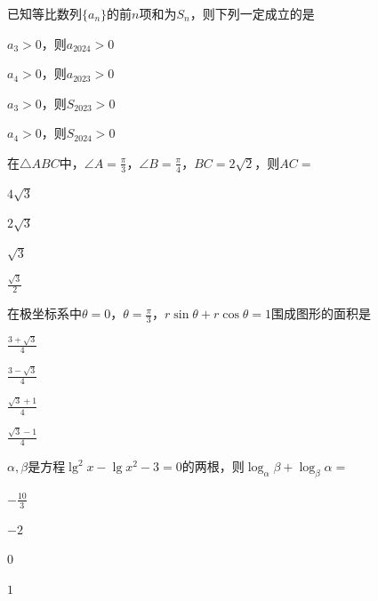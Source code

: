 \documentclass{exam-zh}
\begin{document}
\begin{question}
  已知等比数列$\{a_n\}$的前$n$项和为$S_n$，则下列一定成立的是 \paren

  \begin{choices}
    \item $a_3>0$，则$a_{2024}>0$
    \item $a_4>0$，则$a_{2023}>0$
    \item $a_3>0$，则$S_{2023}>0$
    \item $a_4>0$，则$S_{2024}>0$
  \end{choices}
\end{question}

\begin{question}
  在$\triangle ABC$中，$\angle A=\frac\pi3$，$\angle B=\frac\pi4$，$BC=2\sqrt2$，则$AC=$ \paren

  \begin{choices}
    \item $4\sqrt3$
    \item $2\sqrt3$
    \item $\sqrt3$
    \item $\frac{\sqrt3}2$
  \end{choices}
\end{question}

\begin{question}
  在极坐标系中$\theta=0$，$\theta=\frac\pi3$，$r\sin\theta+r\cos\theta=1$围成图形的面积是 \paren

  \begin{choices}
    \item $\frac{3+\sqrt3}4$
    \item $\frac{3-\sqrt3}4$
    \item $\frac{\sqrt3+1}4$
    \item $\frac{\sqrt3-1}4$
  \end{choices}
\end{question}

\begin{question}
  $\alpha,\beta$是方程$\lg^2 x-\lg x^2-3=0$的两根，则$\log_\alpha\beta+\log_\beta\alpha=$ \paren

  \begin{choices}
    \item $-\frac{10}3$
    \item $-2$
    \item $0$
    \item $1$
  \end{choices}
\end{question}
\end{document}

